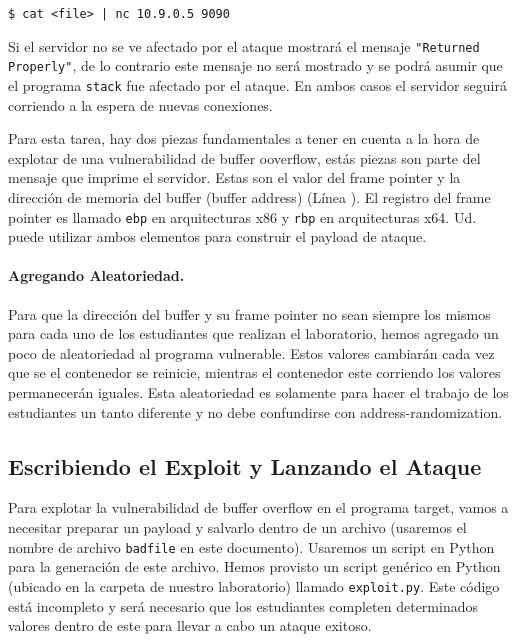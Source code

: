 \begin{lstlisting}
$ cat <file> | nc 10.9.0.5 9090
\end{lstlisting}

Si el servidor no se ve afectado por el ataque mostrará el mensaje \texttt{"Returned Properly"}, de lo contrario este mensaje no será mostrado y se podrá asumir que el programa 
\texttt{stack} fue afectado por el ataque.
En ambos casos el servidor seguirá corriendo a la espera de nuevas conexiones.

Para esta tarea, hay dos piezas fundamentales a tener en cuenta a la hora de explotar de una vulnerabilidad de buffer ooverflow, estás piezas son parte del mensaje que imprime el servidor.
Estas son el valor del frame pointer y la dirección de memoria del buffer (buffer address) (Línea ). El registro del frame pointer es llamado \texttt{ebp} en arquitecturas x86 y \texttt{rbp} en arquitecturas x64.
Ud. puede utilizar ambos elementos para construir el payload de ataque.

\paragraph{Agregando Aleatoriedad.} Para que la dirección del buffer y su frame pointer no sean siempre los mismos para cada uno de los estudiantes que realizan el laboratorio, hemos agregado un poco de aleatoriedad al programa vulnerable. Estos valores cambiarán cada vez que se el contenedor se reinicie, mientras el contenedor este corriendo los valores permanecerán iguales. Esta aleatoriedad es solamente para hacer el trabajo de los estudiantes un tanto diferente y no debe confundirse con address-randomization.


\subsection{Escribiendo el Exploit y Lanzando el Ataque} 

Para explotar la vulnerabilidad de buffer overflow en el programa target, vamos a necesitar preparar un payload y salvarlo dentro de un archivo (usaremos el nombre de archivo \texttt{badfile} en este documento).
Usaremos un script en Python para la generación de este archivo. 
Hemos provisto un script genérico en Python (ubicado en la carpeta de nuestro laboratorio) llamado \texttt{exploit.py}.
Este código está incompleto y será necesario que los estudiantes completen determinados valores dentro de este para llevar a cabo un ataque exitoso.


